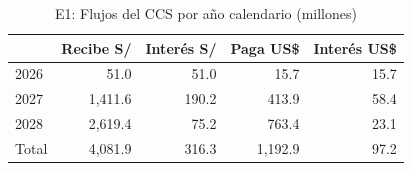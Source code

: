 \begin{table}[htbp]\centering\small
\caption{E1: Flujos del CCS por año calendario (millones)}\label{tab:e1-flujos}
\begin{tabular}{lrrrr}
\toprule
 & \textbf{Recibe S/} & \textbf{Interés S/} & \textbf{Paga US\$} & \textbf{Interés US\$} \\
\midrule
2026 & 51.0 & 51.0 & 15.7 & 15.7 \\
2027 & 1,411.6 & 190.2 & 413.9 & 58.4 \\
2028 & 2,619.4 & 75.2 & 763.4 & 23.1 \\
Total & 4,081.9 & 316.3 & 1,192.9 & 97.2 \\
\bottomrule
\end{tabular}
\end{table}
